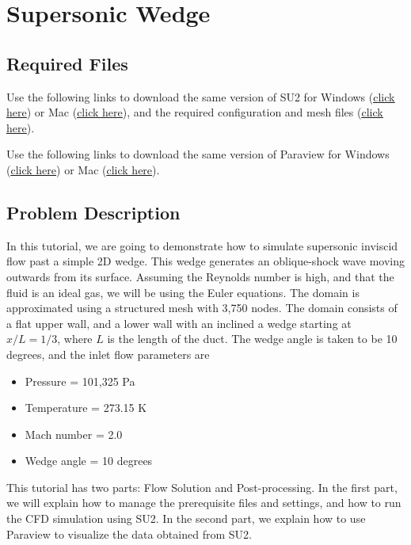 \chapter{Supersonic Wedge}
\label{ch:Supersonic Wedge}
\section{Required Files}
\begin{su2note}
	Use the following links to download the same version of SU2 for Windows (\href{https://users.encs.concordia.ca/~bvermeir/book/executables/windows/SU2_Windows.zip}{\underline{click here}}) or Mac (\href{https://users.encs.concordia.ca/~bvermeir/book/executables/osx/SU2_Mac.zip}{\underline{click here}}), and the required configuration and mesh files (\href{https://gitlab.com/bvermeir/book-cfd/blob/master/tutorial/tut2_supersonic_wedge/wedge.zip}{\underline{click here}}).
\end{su2note}
\begin{paraviewnote}
	Use the following links to download the same version of Paraview for Windows (\href{https://users.encs.concordia.ca/~bvermeir/book/executables/windows/ParaView-5.4.0-Qt5-OpenGL2-Windows-64bit.exe}{\underline{click here}}) or Mac (\href{https://users.encs.concordia.ca/~bvermeir/book/executables/osx/ParaView-5.4.0-Qt5-OpenGL2-MPI-OSX10.8-64bit.dmg}{\underline{click here}}).
\end{paraviewnote}

\section{Problem Description}
In this tutorial, we are going to demonstrate how to simulate supersonic inviscid flow past a simple 2D wedge. This wedge generates an oblique-shock wave moving outwards from its surface. Assuming the Reynolds number is high, and that the fluid is an ideal gas, we will be using the Euler equations. The domain is approximated using a structured mesh with 3,750 nodes. The domain consists of a flat upper wall, and a lower wall with an inclined a wedge starting at $x/L=1/3$, where $L$ is the length of the duct. The wedge angle is taken to be 10 degrees, and the inlet flow parameters are
\begin{itemize}
    \item Pressure = 101,325 Pa
    \item Temperature = 273.15 K
    \item Mach number = 2.0
    \item Wedge angle = 10 degrees
\end{itemize}
This tutorial has two parts: Flow Solution and Post-processing. In the first part, we will explain how to manage the prerequisite files and settings, and how to run the CFD simulation using SU2. In the second part, we explain how to use Paraview to visualize the data obtained from SU2.
